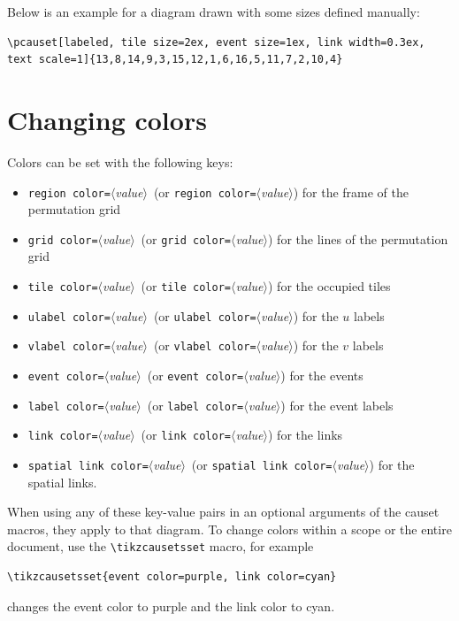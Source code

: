 \documentclass[12pt]{article}
\newcommand*{\PH}[1][value]{{\small\itshape$\langle$#1$\rangle$}} %
\begin{document}
Below is an example for a diagram drawn with some sizes defined manually:
\begin{lstlisting}
\pcauset[labeled, tile size=2ex, event size=1ex, link width=0.3ex, text scale=1]{13,8,14,9,3,15,12,1,6,16,5,11,7,2,10,4}
\end{lstlisting}
\begin{center}
\end{center}
\vspace{1ex}


\section{Changing colors}
\label{sec:Colors}

Colors can be set with the following keys: \vspace{-1ex}
\begin{itemize}\itemsep=-1ex
  \item \lstinline&region color=&\PH\ (or \lstinline&region color=&\PH) for the frame of the permutation grid
  \item \lstinline&grid color=&\PH\ (or \lstinline&grid color=&\PH) for the lines of the permutation grid
  \item \lstinline&tile color=&\PH\ (or \lstinline&tile color=&\PH) for the occupied tiles
  \item \lstinline&ulabel color=&\PH\ (or \lstinline&ulabel color=&\PH) for the $u$ labels
  \item \lstinline&vlabel color=&\PH\ (or \lstinline&vlabel color=&\PH) for the $v$ labels
  \item \lstinline&event color=&\PH\ (or \lstinline&event color=&\PH) for the events
  \item \lstinline&label color=&\PH\ (or \lstinline&label color=&\PH) for the event labels
  \item \lstinline&link color=&\PH\ (or \lstinline&link color=&\PH) for the links
  \item \lstinline&spatial link color=&\PH\ (or \lstinline&spatial link color=&\PH) for the spatial links.
\end{itemize}
When using any of these key-value pairs in an optional arguments of the causet macros, they apply to that diagram.
To change colors within a scope or the entire document, use the \lstinline&\tikzcausetsset& macro, for example
\begin{lstlisting}
\tikzcausetsset{event color=purple, link color=cyan}
\end{lstlisting}
changes the event color to purple and the link color to cyan.
\end{document}
